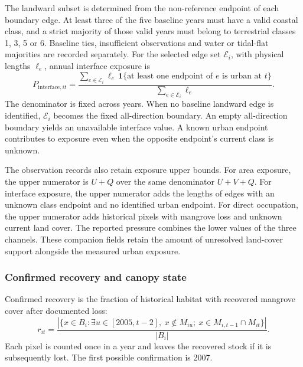 The landward subset is determined from the non-reference endpoint of each boundary edge. At least three of the five baseline years must have a valid coastal class, and a strict majority of those valid years must belong to terrestrial classes 1, 3, 5 or 6. Baseline ties, insufficient observations and water or tidal-flat majorities are recorded separately. For the selected edge set $\mathcal{E}_i$, with physical lengths $\ell_e$, annual interface exposure is
\[
P_{\mathrm{interface},it}=
\frac{\sum_{e\in\mathcal{E}_i}\ell_e\,
\mathbf{1}\{\text{at least one endpoint of }e\text{ is urban at }t\}}
{\sum_{e\in\mathcal{E}_i}\ell_e}.
\]
The denominator is fixed across years. When no baseline landward edge is identified, $\mathcal{E}_i$ becomes the fixed all-direction boundary. An empty all-direction boundary yields an unavailable interface value. A known urban endpoint contributes to exposure even when the opposite endpoint's current class is unknown.

The observation records also retain exposure upper bounds. For area exposure, the upper numerator is $U+Q$ over the same denominator $U+V+Q$. For interface exposure, the upper numerator adds the lengths of edges with an unknown class endpoint and no identified urban endpoint. For direct occupation, the upper numerator adds historical pixels with mangrove loss and unknown current land cover. The reported pressure combines the lower values of the three channels. These companion fields retain the amount of unresolved land-cover support alongside the measured urban exposure.

\subsubsection{Confirmed recovery and canopy state}

Confirmed recovery is the fraction of historical habitat with recovered mangrove cover after documented loss:
\begin{equation}\label{eq:si_recovery}
r_{it}=\frac{\left|\{x\in B_i:\exists u\in[2005,t-2],\ x\notin M_{iu};\ x\in M_{i,t-1}\cap M_{it}\}\right|}{|B_i|}.
\end{equation}
Each pixel is counted once in a year and leaves the recovered stock if it is subsequently lost. The first possible confirmation is 2007. 

